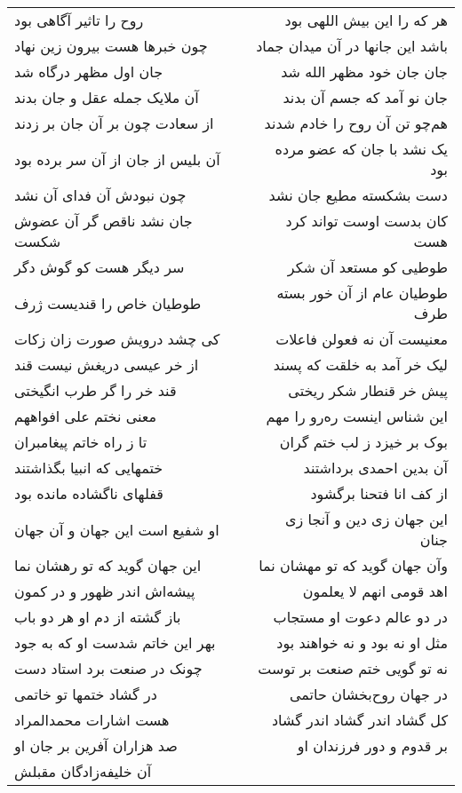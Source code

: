 \begin{center}
\begin{longtable}{l p{0.5cm} r}
روح را تاثیر آگاهی بود
&&
هر که را این بیش اللهی بود
\\
چون خبرها هست بیرون زین نهاد
&&
باشد این جانها در آن میدان جماد
\\
جان اول مظهر درگاه شد
&&
جان جان خود مظهر الله شد
\\
آن ملایک جمله عقل و جان بدند
&&
جان نو آمد که جسم آن بدند
\\
از سعادت چون بر آن جان بر زدند
&&
هم‌چو تن آن روح را خادم شدند
\\
آن بلیس از جان از آن سر برده بود
&&
یک نشد با جان که عضو مرده بود
\\
چون نبودش آن فدای آن نشد
&&
دست بشکسته مطیع جان نشد
\\
جان نشد ناقص گر آن عضوش شکست
&&
کان بدست اوست تواند کرد هست
\\
سر دیگر هست کو گوش دگر
&&
طوطیی کو مستعد آن شکر
\\
طوطیان خاص را قندیست ژرف
&&
طوطیان عام از آن خور بسته طرف
\\
کی چشد درویش صورت زان زکات
&&
معنیست آن نه فعولن فاعلات
\\
از خر عیسی دریغش نیست قند
&&
لیک خر آمد به خلقت که پسند
\\
قند خر را گر طرب انگیختی
&&
پیش خر قنطار شکر ریختی
\\
معنی نختم علی افواههم
&&
این شناس اینست ره‌رو را مهم
\\
تا ز راه خاتم پیغامبران
&&
بوک بر خیزد ز لب ختم گران
\\
ختمهایی که انبیا بگذاشتند
&&
آن بدین احمدی برداشتند
\\
قفلهای ناگشاده مانده بود
&&
از کف انا فتحنا برگشود
\\
او شفیع است این جهان و آن جهان
&&
این جهان زی دین و آنجا زی جنان
\\
این جهان گوید که تو رهشان نما
&&
وآن جهان گوید که تو مهشان نما
\\
پیشه‌اش اندر ظهور و در کمون
&&
اهد قومی انهم لا یعلمون
\\
باز گشته از دم او هر دو باب
&&
در دو عالم دعوت او مستجاب
\\
بهر این خاتم شدست او که به جود
&&
مثل او نه بود و نه خواهند بود
\\
چونک در صنعت برد استاد دست
&&
نه تو گویی ختم صنعت بر توست
\\
در گشاد ختمها تو خاتمی
&&
در جهان روح‌بخشان حاتمی
\\
هست اشارات محمدالمراد
&&
کل گشاد اندر گشاد اندر گشاد
\\
صد هزاران آفرین بر جان او
&&
بر قدوم و دور فرزندان او
\\
آن خلیفه‌زادگان مقبلش

\end{longtable}
\end{center}

